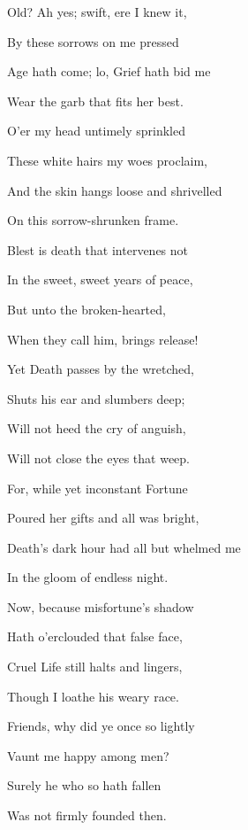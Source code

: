 Old? Ah yes; swift, ere I knew it,

By these sorrows on me pressed

Age hath come; lo, Grief hath bid me

Wear the garb that fits her best.

O'er my head untimely sprinkled

These white hairs my woes proclaim,

And the skin hangs loose and shrivelled

On this sorrow-shrunken frame.

Blest is death that intervenes not

In the sweet, sweet years of peace,

But unto the broken-hearted,

When they call him, brings release!

Yet Death passes by the wretched,

Shuts his ear and slumbers deep;

Will not heed the cry of anguish,

Will not close the eyes that weep.

For, while yet inconstant Fortune

Poured her gifts and all was bright,

Death's dark hour had all but whelmed me

In the gloom of endless night.

Now, because misfortune's shadow

Hath o'erclouded that false face,

Cruel Life still halts and lingers,

Though I loathe his weary race.

Friends, why did ye once so lightly

Vaunt me happy among men?

Surely he who so hath fallen

Was not firmly founded then.


